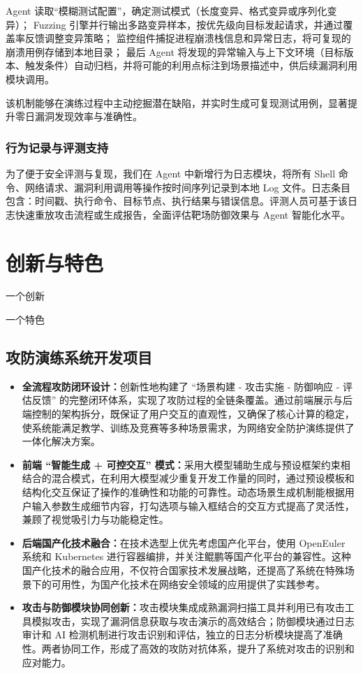 \documentclass[lang=cn,10pt]{elegantbook}
\begin{document}
Agent 读取“模糊测试配置”，确定测试模式（长度变异、格式变异或序列化变异）；  
Fuzzing 引擎并行输出多路变异样本，按优先级向目标发起请求，并通过覆盖率反馈调整变异策略；  
监控组件捕捉进程崩溃栈信息和异常日志，将可复现的崩溃用例存储到本地目录；  
最后 Agent 将发现的异常输入与上下文环境（目标版本、触发条件）自动归档，并将可能的利用点标注到场景描述中，供后续漏洞利用模块调用。

该机制能够在演练过程中主动挖掘潜在缺陷，并实时生成可复现测试用例，显著提升零日漏洞发现效率与准确性。


\subsection{行为记录与评测支持}
为了便于安全评测与复现，我们在 Agent 中新增行为日志模块，将所有 Shell 命令、网络请求、漏洞利用调用等操作按时间序列记录到本地 Log 文件。日志条目包含：时间戳、执行命令、目标节点、执行结果与错误信息。评测人员可基于该日志快速重放攻击流程或生成报告，全面评估靶场防御效果与 Agent 智能化水平。





\chapter{创新与特色}
\begin{introduction}
  \item 一个创新
  \item 一个特色
\end{introduction}

\section{攻防演练系统开发项目}
\begin{itemize}
    \item \textbf{全流程攻防闭环设计：}创新性地构建了 “场景构建 - 攻击实施 - 防御响应 - 评估反馈” 的完整闭环体系，实现了攻防过程的全链条覆盖。通过前端展示与后端控制的架构拆分，既保证了用户交互的直观性，又确保了核心计算的稳定，使系统能满足教学、训练及竞赛等多种场景需求，为网络安全防护演练提供了一体化解决方案。
    \item \textbf{前端 “智能生成 + 可控交互” 模式：}采用大模型辅助生成与预设框架约束相结合的混合模式，在利用大模型减少重复开发工作量的同时，通过预设模板和结构化交互保证了操作的准确性和功能的可靠性。动态场景生成机制能根据用户输入参数生成细节内容，打勾选项与输入框结合的交互方式提高了灵活性，兼顾了视觉吸引力与功能稳定性。
    \item \textbf{后端国产化技术融合：}在技术选型上优先考虑国产化平台，使用 OpenEuler 系统和 Kubernetes 进行容器编排，并关注鲲鹏等国产化平台的兼容性。这种国产化技术的融合应用，不仅符合国家技术发展战略，还提高了系统在特殊场景下的可用性，为国产化技术在网络安全领域的应用提供了实践参考。
    \item \textbf{攻击与防御模块协同创新：}攻击模块集成成熟漏洞扫描工具并利用已有攻击工具模拟攻击，实现了漏洞信息获取与攻击演示的高效结合；防御模块通过日志审计和 AI 检测机制进行攻击识别和评估，独立的日志分析模块提高了准确性。两者协同工作，形成了高效的攻防对抗体系，提升了系统对攻击的识别和应对能力。
\end{itemize}
\end{document}
